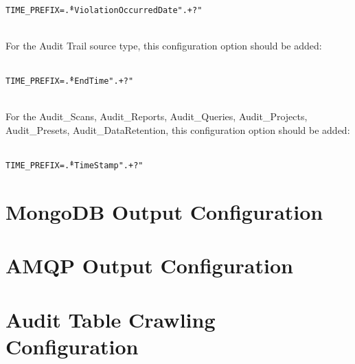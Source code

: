 \noindent\\\texttt{TIME\_PREFIX=\^.*ViolationOccurredDate".+?"}

\noindent\\For the Audit Trail source type, this configuration option should be added:

\noindent\\\texttt{TIME\_PREFIX=\^.*EndTime".+?"}

\noindent\\For the Audit\_Scans, Audit\_Reports, Audit\_Queries, Audit\_Projects, Audit\_Presets, Audit\_DataRetention, this configuration option should be added:

\noindent\\\texttt{TIME\_PREFIX=\^.*TimeStamp".+?"}



\section{MongoDB Output Configuration}\label{sec:mongo_config}
\section{AMQP Output Configuration}\label{sec:amqp_config}

\section{Audit Table Crawling Configuration}
